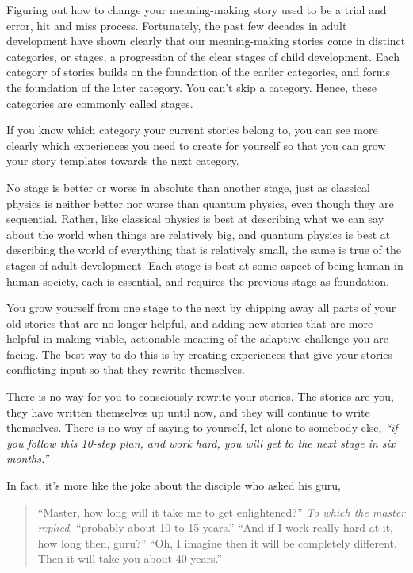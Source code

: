 Figuring out how to change your meaning-making story used to be a trial and error, hit and miss process. Fortunately, the past few decades in adult development have shown clearly\cite{constantin-are-developmental-stages-real} that our meaning-making stories come in distinct categories, or stages, a progression of the clear stages of child development. Each category of stories builds on the foundation of the earlier categories, and forms the foundation of the later category. You can't skip a category. Hence, these categories are commonly called stages. 


If you know which category your current stories belong to, you can see more clearly which experiences you need to create for yourself so that you can grow your story templates towards the next category.


No stage is better or worse in absolute than another stage, just as classical physics is neither better nor worse than quantum physics, even though they are sequential. Rather, like classical physics is best at describing what we can say about the world when things are relatively big, and quantum physics is best at describing the world of everything that is relatively small, the same is true of the stages of adult development. Each stage is best at some aspect of being human in human society, each is essential, and requires the previous stage as foundation. 


You grow yourself from one stage to the next by chipping away all parts of your old stories that are no longer helpful, and adding new stories that are more helpful in making viable, actionable meaning of the adaptive challenge you are facing. The best way to do this is by creating experiences that give your stories conflicting input so that they rewrite themselves.


There is no way for you to consciously rewrite your stories. The stories are you, they have written themselves up until now, and they will continue to write themselves. There is no way of saying to yourself, let alone to somebody else, \emph{“if you follow this 10-step plan, and work hard, you will get to the next stage in six months.”}


In fact, it's more like the joke about the disciple who asked his guru, 
\begin{quotation}
 “Master, how long will it take me to get enlightened?”
\emph{To which the master replied}, “probably about 10 to 15 years.”
 “And if I work really hard at it, how long then, guru?”
 “Oh, I imagine then it will be completely different. Then it will take you about 40 years.”
\end{quotation}


